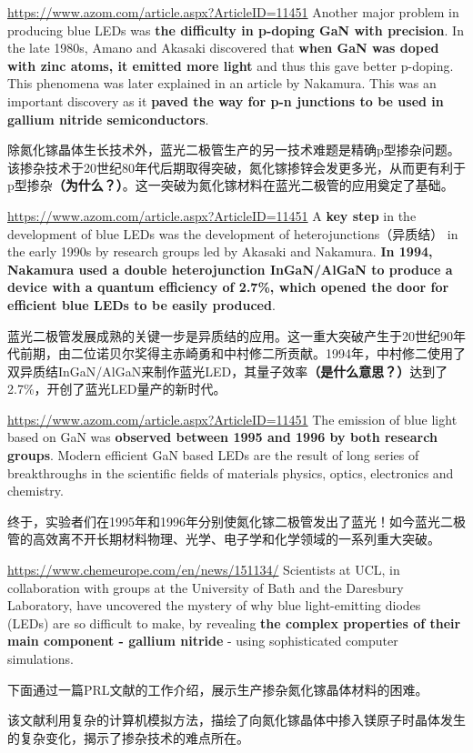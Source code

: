 \documentclass{beamer}
\newenvironment{slide}{
    \begin{frame}{\bfseries{\sectiontitle}}
}{
    \end{frame}
}
\begin{document}
\begin{slide}{\url{https://www.azom.com/article.aspx?ArticleID=11451}}
    Another major problem in producing blue LEDs was \textbf{the difficulty in p-doping GaN with precision}. In the late 1980s, Amano and Akasaki discovered that \textbf{when GaN was doped with zinc atoms, it emitted more light} and thus this gave better p-doping. This phenomena was later explained in an article by Nakamura. This was an important discovery as it \textbf{paved the way for p-n junctions to be used in gallium nitride semiconductors}.
    \bigskip

    除氮化镓晶体生长技术外，蓝光二极管生产的另一技术难题是精确p型掺杂问题。该掺杂技术于20世纪80年代后期取得突破，氮化镓掺锌会发更多光，从而更有利于p型掺杂\textbf{（为什么？）}。这一突破为氮化镓材料在蓝光二极管的应用奠定了基础。
\end{slide}

\begin{slide}{\url{https://www.azom.com/article.aspx?ArticleID=11451}}
    A \textbf{key step} in the development of blue LEDs was the development of heterojunctions（异质结） in the early 1990s by research groups led by Akasaki and Nakamura. \textbf{In 1994, Nakamura used a double heterojunction InGaN/AlGaN to produce a device with a quantum efficiency of 2.7\%, which opened the door for efficient blue LEDs to be easily produced}.
    \bigskip

    蓝光二极管发展成熟的关键一步是异质结的应用。这一重大突破产生于20世纪90年代前期，由二位诺贝尔奖得主赤崎勇和中村修二所贡献。1994年，中村修二使用了双异质结InGaN/AlGaN来制作蓝光LED，其量子效率\textbf{（是什么意思？）}达到了2.7\%，开创了蓝光LED量产的新时代。
\end{slide}

\begin{slide}{\url{https://www.azom.com/article.aspx?ArticleID=11451}}
    The emission of blue light based on GaN was \textbf{observed between 1995 and 1996 by both research groups}. Modern efficient GaN based LEDs are the result of long series of breakthroughs in the scientific fields of materials physics, optics, electronics and chemistry.
    \bigskip

    终于，实验者们在1995年和1996年分别使氮化镓二极管发出了蓝光！如今蓝光二极管的高效离不开长期材料物理、光学、电子学和化学领域的一系列重大突破。
\end{slide}

\begin{slide}{\url{https://www.chemeurope.com/en/news/151134/}}
    Scientists at UCL, in collaboration with groups at the University of Bath and the Daresbury Laboratory, have uncovered the mystery of why blue light-emitting diodes (LEDs) are so difficult to make, by revealing \textbf{the complex properties of their main component - gallium nitride} - using sophisticated computer simulations.
    \bigskip

    下面通过一篇PRL文献的工作介绍，展示生产掺杂氮化镓晶体材料的困难。
    \medskip

    该文献利用复杂的计算机模拟方法，描绘了向氮化镓晶体中掺入镁原子时晶体发生的复杂变化，揭示了掺杂技术的难点所在。
\end{slide}
\end{document}

